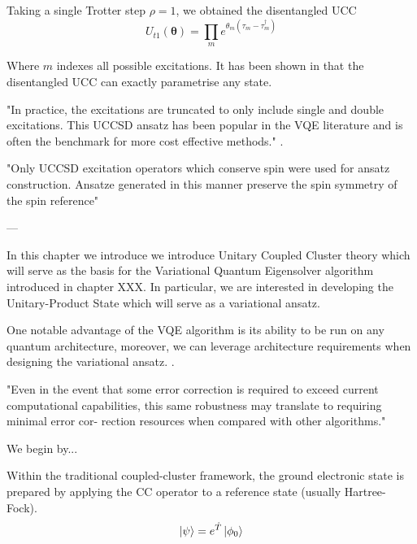 Taking a single Trotter step $\rho=1$, we obtained the disentangled UCC
\begin{equation}
    U_{t1}(\mathbf\theta) = \prod_m e^{\theta_m (\tau_m - \tau_m^\dagger)}
\end{equation}

Where $m$ indexes all possible excitations. It has been shown in \cite{Evangelista2019} that the disentangled UCC can exactly parametrise any state.

"In practice, the excitations are truncated to only include single and double excitations. This UCCSD ansatz has been popular in the VQE literature and is often the benchmark for more cost effective methods." \cite{Chan2021}.

"Only UCCSD excitation operators which conserve spin were
used for ansatz construction. Ansatze generated in this manner
preserve the spin symmetry of the spin reference" \cite{Chan2021}

---

In this chapter we introduce we introduce Unitary Coupled Cluster theory which will serve as the basis for the Variational Quantum Eigensolver algorithm introduced in chapter XXX. In particular, we are interested in developing the Unitary-Product State which will serve as a variational ansatz.



One notable advantage of the VQE algorithm is its ability to be run on any quantum architecture, moreover, we can leverage architecture requirements when designing the variational ansatz. \cite{McClean2016}.

"Even in the event that some error correction is required to exceed current computational capabilities, this same robustness may translate to requiring minimal error cor- rection resources when compared with other algorithms." \cite{McClean2016}

We begin by...



Within the traditional coupled-cluster framework, the ground electronic state is prepared by applying the CC operator to a reference state (usually Hartree-Fock).
\begin{equation*}
    \ket\psi = e^{\hat T} \ket{\phi_0}
\end{equation*}

